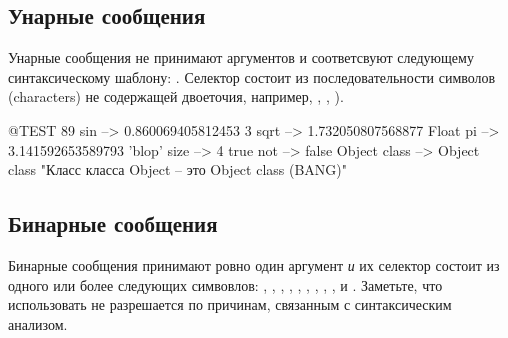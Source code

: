 \documentclass[a4paper,10pt,twoside]{book}
\begin{document}
\subsection{Унарные сообщения}
Унарные сообщения не принимают аргументов и соответсвуют следующему синтаксическому шаблону: . Селектор состоит из последовательности символов (characters) не содержащей двоеточия, например, , , ).
\begin{code}{@TEST}
89 sin           --> 0.860069405812453
3 sqrt           --> 1.732050807568877
Float pi         --> 3.141592653589793
'blop' size     --> 4
true not        --> false
Object class --> Object class  "Класс класса Object -- это Object class (BANG)"
\end{code}

\important{Унарные сообщения не принимают аргументов.\\
Они соответствуют синтаксическому шаблону: \lct{получатель \textbf{селектор}}}

\subsection{Бинарные сообщения} 
Бинарные сообщения принимают ровно один аргумент \emph{и} их селектор состоит из одного или более следующих симвовлов: \ct{+}, \ct{-}, \ct{*}, \ct{/}, \ct{&}, \ct{=}, \ct{>}, \ct{|}, \ct{<}, \ct{~} и . Заметьте, что использовать \ct{--} не разрешается по причинам, связанным с синтаксическим анализом.
\end{document}
